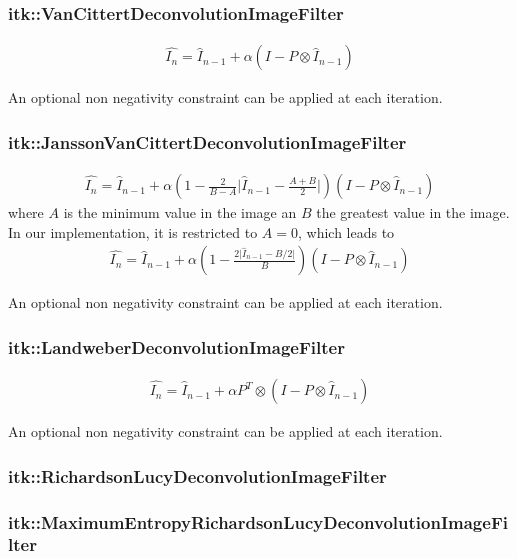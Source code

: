 \documentclass{InsightArticle}
\begin{document}
\subsubsection{itk::VanCittertDeconvolutionImageFilter}

\begin{eqnarray}
\label{eq:imageFormation}
\hat{I_n} = \hat{I}_{n-1} + \alpha \left( I -P \otimes \hat{I}_{n-1}  \right)
\end{eqnarray}

An optional non negativity constraint can be applied at each iteration.

\subsubsection{itk::JanssonVanCittertDeconvolutionImageFilter}

\begin{eqnarray}
\label{eq:imageFormation}
\hat{I_n} = \hat{I}_{n-1} + \alpha\left(1-\frac{2}{B-A}\lvert \hat{I}_{n-1}-\frac{A+B}{2}\rvert\right) \left( I - P \otimes \hat{I}_{n-1}  \right)
\end{eqnarray}
where $A$ is the minimum value in the image an $B$ the greatest value in the image.
In our implementation, it is restricted to $A=0$, which leads to
\begin{eqnarray}
\label{eq:imageFormation}
\hat{I_n} = \hat{I}_{n-1} + \alpha\left(1-\frac{2\lvert \hat{I}_{n-1}-B/2\rvert}{B}\right) \left( I - P \otimes \hat{I}_{n-1}  \right)
\end{eqnarray}

An optional non negativity constraint can be applied at each iteration.

\subsubsection{itk::LandweberDeconvolutionImageFilter}

\begin{eqnarray}
\label{eq:imageFormation}
\hat{I_n} = \hat{I}_{n-1} + \alpha P^T \otimes \left( I - P \otimes \hat{I}_{n-1}  \right)
\end{eqnarray}

An optional non negativity constraint can be applied at each iteration.
\subsubsection{itk::RichardsonLucyDeconvolutionImageFilter}
\subsubsection{itk::MaximumEntropyRichardsonLucyDeconvolutionImageFilter}
\end{document}
